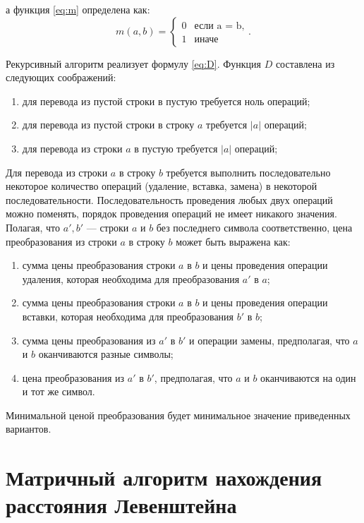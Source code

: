         а функция \ref{eq:m} определена как:
        \begin{equation}
        	\label{eq:m}
        	m(a, b) = \begin{cases}
        		0 &\text{если a = b,}\\
        		1 &\text{иначе}
        	\end{cases}.
        \end{equation}
        
        Рекурсивный алгоритм реализует формулу \ref{eq:D}.
        Функция $D$ составлена из следующих соображений:
        \begin{enumerate}
        	\item для перевода из пустой строки в пустую требуется ноль операций;
        	\item для перевода из пустой строки в строку $a$ требуется $|a|$ операций;
        	\item для перевода из строки $a$ в пустую требуется $|a|$ операций;
        \end{enumerate}
        Для перевода из строки $a$ в строку $b$ требуется выполнить последовательно некоторое количество операций (удаление, вставка, замена) в некоторой последовательности. Последовательность проведения любых двух операций можно поменять, порядок проведения операций не имеет никакого значения. Полагая, что $a', b'$  — строки $a$ и $b$ без последнего символа соответственно, цена преобразования из строки $a$ в строку $b$ может быть выражена как:
        	\begin{enumerate}
        		\item сумма цены преобразования строки $a$ в $b$ и цены проведения операции удаления, которая необходима для преобразования $a'$ в $a$;
        		\item сумма цены преобразования строки $a$ в $b$  и цены проведения операции вставки, которая необходима для преобразования $b'$ в $b$;
        		\item сумма цены преобразования из $a'$ в $b'$ и операции замены, предполагая, что $a$ и $b$ оканчиваются разные символы;
        		\item цена преобразования из $a'$ в $b'$, предполагая, что $a$ и $b$ оканчиваются на один и тот же символ.
        	\end{enumerate}
        Минимальной ценой преобразования будет минимальное значение приведенных вариантов.
    
    \section{Матричный алгоритм нахождения расстояния Левенштейна}
    
